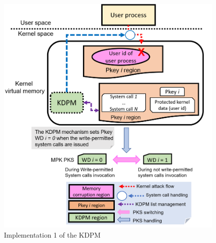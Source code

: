 \begin{figure}[tb]
  \begin{center}
    \includegraphics[bb=0 0 826 887, scale=.260]{./imgs/004_screenshot_2021-07-28_18.34.36.png}
  \end{center}
  \caption{
    Implementation 1 of the KDPM
  }
 \label{fig:implementation1_overview}
\end{figure}

